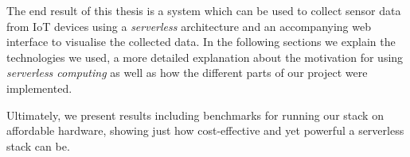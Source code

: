 The end result of this thesis is a system which can be used to collect sensor data from IoT devices
using a \textit{serverless} architecture and an accompanying web interface to visualise the
collected data. In the following sections we explain the technologies we used, a more detailed
explanation about the motivation for using \textit{serverless computing} as well as how the
different parts of our project were implemented.

Ultimately, we present results including benchmarks for running our stack on affordable hardware,
showing just how cost-effective and yet powerful a serverless stack can be.
